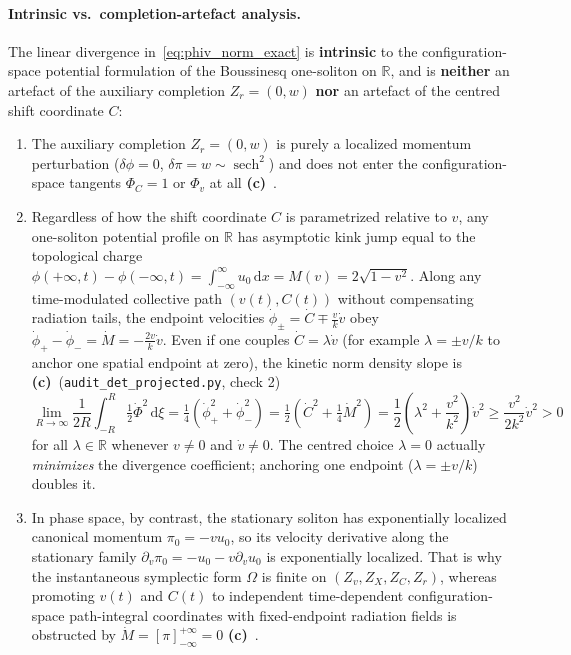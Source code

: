 \documentclass[11pt,a4paper]{article}
\newcommand{\Lc}{\textsf{\textbf{(c)}}\ }
\newcommand{\scr}{\texttt{audit\_\allowbreak det\_\allowbreak projected.py}}
\newcommand{\dd}{\mathrm d}
\newcommand{\R}{\mathbb R}
\begin{document}
\paragraph{Intrinsic vs.\ completion-artefact analysis.}
The linear divergence in~\eqref{eq:phiv_norm_exact} is \textbf{intrinsic} to the
configuration-space potential formulation of the Boussinesq one-soliton on $\R$,
and is \textbf{neither} an artefact of the auxiliary completion $Z_r=(0,w)$
\textbf{nor} an artefact of the centred shift coordinate $C$:
\begin{enumerate}
\item The auxiliary completion $Z_r=(0,w)$ is purely a localized momentum
perturbation ($\delta\phi=0$, $\delta\pi=w\sim\operatorname{sech}^2$) and does
not enter the configuration-space tangents $\Phi_C=1$ or $\Phi_v$ at all \Lc.
\item Regardless of how the shift coordinate $C$ is parametrized relative to $v$,
any one-soliton potential profile on $\R$ has asymptotic kink jump equal to the
topological charge $\phi(+\infty,t)-\phi(-\infty,t)=\int_{-\infty}^\infty u_0\,\dd x
=M(v)=2\sqrt{1-v^2}$. Along any time-modulated collective path $(v(t),C(t))$
without compensating radiation tails, the endpoint velocities
$\dot\phi_\pm=\dot C\mp\frac{v}{k}\dot v$ obey
$\dot\phi_+-\dot\phi_-=\dot M=-\frac{2v}{k}\dot v$. Even if one couples
$\dot C=\lambda\dot v$ (for example $\lambda=\pm v/k$ to anchor one spatial
endpoint at zero), the kinetic norm density slope is \Lc (\scr, check 2)
\begin{equation}\label{eq:intrinsic_bound}
 \lim_{R\to\infty}\frac{1}{2R}\int_{-R}^R\tfrac12\dot\Phi^2\,\dd\xi
 = \tfrac14(\dot\phi_+^2+\dot\phi_-^2)
 = \tfrac12\left(\dot C^2+\tfrac14\dot M^2\right)
 = \frac12\left(\lambda^2+\frac{v^2}{k^2}\right)\dot v^2
 \ge \frac{v^2}{2k^2}\dot v^2 > 0
\end{equation}
for all $\lambda\in\R$ whenever $v\ne0$ and $\dot v\ne0$. The centred choice
$\lambda=0$ actually \emph{minimizes} the divergence coefficient; anchoring one
endpoint ($\lambda=\pm v/k$) doubles it.
\item In phase space, by contrast, the stationary soliton has exponentially
localized canonical momentum $\pi_0=-vu_0$, so its velocity derivative along the
stationary family $\partial_v\pi_0=-u_0-v\partial_v u_0$ is exponentially
localized. That is why the instantaneous symplectic form $\Omega$ is finite on
$(Z_v,Z_X,Z_C,Z_r)$, whereas promoting $v(t)$ and $C(t)$ to independent
time-dependent configuration-space path-integral coordinates with fixed-endpoint
radiation fields is obstructed by $\dot M=[\pi]_{-\infty}^{+\infty}=0$ \Lc.
\end{enumerate}
\end{document}
